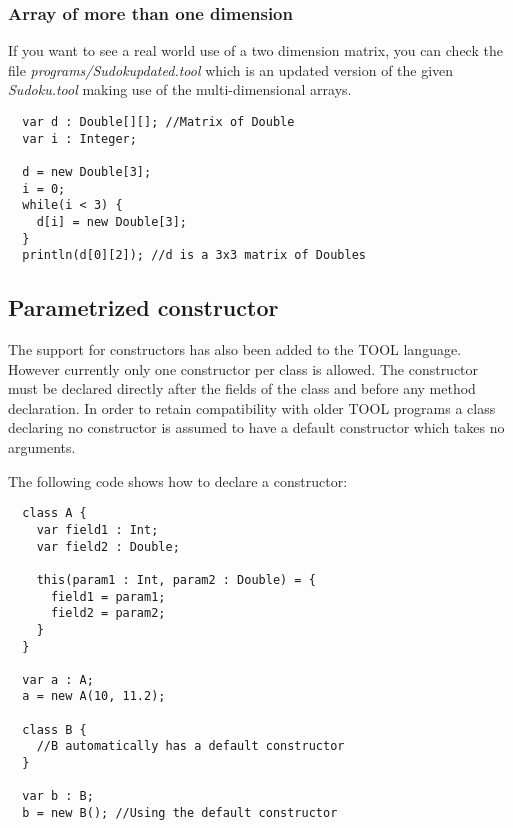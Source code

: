 \subsubsection{Array of more than one dimension}
If you want to see a real world use of a two dimension matrix, you can
check the file \emph{programs/Sudokupdated.tool} which is an updated
version of the given \emph{Sudoku.tool} making use of the
multi-dimensional arrays.

\begin{lstlisting}
  var d : Double[][]; //Matrix of Double
  var i : Integer;

  d = new Double[3];
  i = 0;
  while(i < 3) {
    d[i] = new Double[3];
  }
  println(d[0][2]); //d is a 3x3 matrix of Doubles
\end{lstlisting}

\subsection{Parametrized constructor}

The support for constructors has also been added to the TOOL
language. However currently only one constructor per class is
allowed. The constructor must be declared directly after the fields of
the class and before any method declaration. In order to retain
compatibility with older TOOL programs a class declaring no
constructor is assumed to have a default constructor which takes no
arguments.

The following code shows how to declare a constructor:
\begin{lstlisting}
  class A {
    var field1 : Int;
    var field2 : Double;

    this(param1 : Int, param2 : Double) = {
      field1 = param1;
      field2 = param2;
    }
  }

  var a : A;
  a = new A(10, 11.2);

  class B {
    //B automatically has a default constructor
  }

  var b : B;
  b = new B(); //Using the default constructor
\end{lstlisting}
